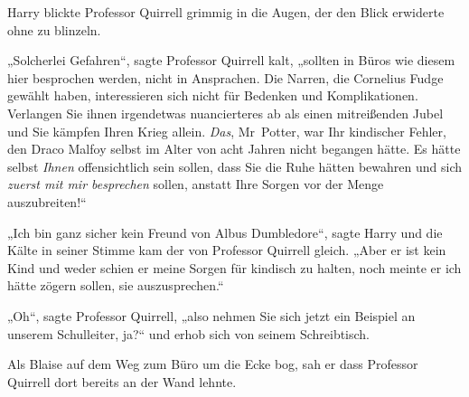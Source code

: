 Harry blickte Professor Quirrell grimmig in die Augen, der den Blick erwiderte ohne zu blinzeln.

„Solcherlei Gefahren“, sagte Professor Quirrell kalt, „sollten in Büros wie diesem hier besprochen werden, nicht in Ansprachen. Die Narren, die Cornelius Fudge gewählt haben, interessieren sich nicht für Bedenken und Komplikationen. Verlangen Sie ihnen irgendetwas nuancierteres ab als einen mitreißenden Jubel und Sie kämpfen Ihren Krieg allein. \emph{Das}, Mr~Potter, war Ihr kindischer Fehler, den Draco Malfoy selbst im Alter von acht Jahren nicht begangen hätte. Es hätte selbst \emph{Ihnen} offensichtlich sein sollen, dass Sie die Ruhe hätten bewahren und sich \emph{zuerst mit mir besprechen} sollen, anstatt Ihre Sorgen vor der Menge auszubreiten!“

„Ich bin ganz sicher kein Freund von Albus Dumbledore“, sagte Harry und die Kälte in seiner Stimme kam der von Professor Quirrell gleich. „Aber er ist kein Kind und weder schien er meine Sorgen für kindisch zu halten, noch meinte er ich hätte zögern sollen, sie auszusprechen.“

„Oh“, sagte Professor Quirrell, „also nehmen Sie sich jetzt ein Beispiel an unserem Schulleiter, ja?“ und erhob sich von seinem Schreibtisch.

\later

Als Blaise auf dem Weg zum Büro um die Ecke bog, sah er dass Professor Quirrell dort bereits an der Wand lehnte.

